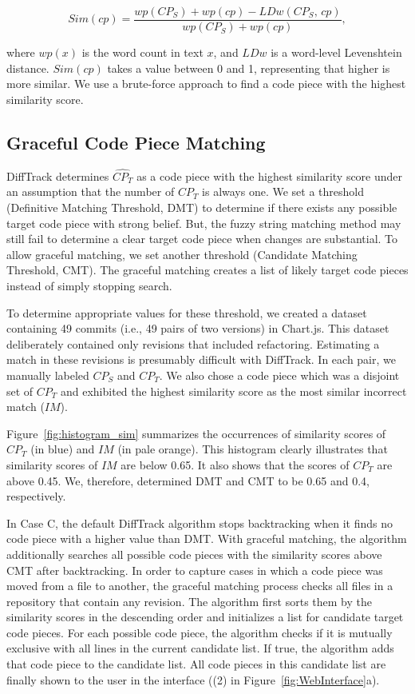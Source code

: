 \begin{equation}
Sim(cp) = \frac{wp(CP_S) + wp(cp) - LDw(CP_S,\, cp)}{wp(CP_S) + wp(cp)},
\end{equation}

where $wp(x)$ is the word count in text $x$, and $LDw$ is a word-level Levenshtein distance.
$Sim(cp)$ takes a value between 0 and 1, representing that higher is more similar.
We use a brute-force approach to find a code piece with the highest similarity score.

\subsection{Graceful Code Piece Matching}

    
DiffTrack determines $\widehat{CP_T}$ as a code piece with the highest similarity score under an assumption that the number of $CP_T$ is always one.
We set a threshold (Definitive Matching Threshold, DMT) to determine if there exists any possible target code piece with strong belief.
But, the fuzzy string matching method may still fail to determine a clear target code piece when changes are substantial.
To allow graceful matching, we set another threshold (Candidate Matching Threshold, CMT).
The graceful matching creates a list of likely target code pieces instead of simply stopping search.

To determine appropriate values for these threshold, we created a dataset containing 49 commits (i.e., 49 pairs of two versions) in Chart.js.
This dataset deliberately contained only revisions that included refactoring.
Estimating a match in these revisions is presumably difficult with DiffTrack.
In each pair, we manually labeled $CP_S$ and $CP_T$.
We also chose a code piece which was a disjoint set of $CP_T$ and exhibited the highest similarity score as the most similar incorrect match ($IM$).

Figure~\ref{fig:histogram_sim} summarizes the occurrences of similarity scores of $CP_T$ (in blue) and $IM$ (in pale orange).
This histogram clearly illustrates that similarity scores of $IM$ are below 0.65.
It also shows that the scores of $CP_T$ are above 0.45.
We, therefore, determined DMT and CMT to be 0.65 and 0.4, respectively.

In Case C, the default DiffTrack algorithm stops backtracking when it finds no code piece with a higher value than DMT.
With graceful matching, the algorithm additionally searches all possible code pieces with the similarity scores above CMT after backtracking.
In order to capture cases in which a code piece was moved from a file to another, the graceful matching process checks all files in a repository that contain any revision. 
The algorithm first sorts them by the similarity scores in the descending order and initializes a list for candidate target code pieces.
For each possible code piece, the algorithm checks if it is mutually exclusive with all lines in the current candidate list.
If true, the algorithm adds that code piece to the candidate list.
All code pieces in this candidate list are finally shown to the user in the interface ((2) in Figure~\ref{fig:WebInterface}a).

